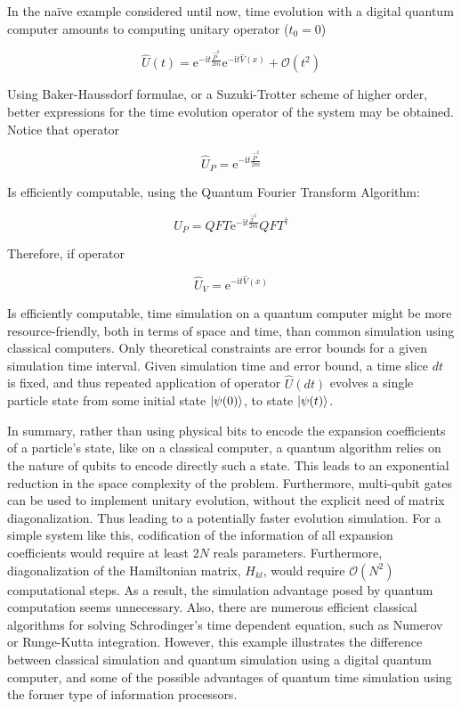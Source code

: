   In the naïve example considered until now, time evolution with a digital quantum computer amounts to computing unitary operator ($t_0 = 0$)

  \begin{equation}
    \hat{U}(t) = \mathrm{e}^{-\mathrm{i}t \frac{\hat{P}^2}{2m}}\mathrm{e}^{-\mathrm{i}t \hat{V}(x)} + \mathcal{O}(t^2)
  \end{equation}

  Using Baker-Haussdorf formulae, or a Suzuki-Trotter scheme of higher order, better expressions for the time evolution operator of the system may be obtained. Notice that operator

  \[
  \hat{U}_P = \mathrm{e}^{-\mathrm{i}t \frac{\hat{P}^2}{2m}}
  \]

  Is efficiently computable, using the Quantum Fourier Transform Algorithm:

  \[
  \hat{U}_P = QFT\mathrm{e}^{-\mathrm{i}t \frac{\hat{x}^2}{2m}}QFT^{\dagger}
  \]

  Therefore, if operator

  \[
  \hat{U}_V = \mathrm{e}^{-\mathrm{i}t \hat{V}(x)}
  \]

  Is efficiently computable, time simulation on a quantum computer might be more resource-friendly, both in terms of space and time, than common simulation using classical computers. Only theoretical constraints are error bounds for a given simulation time interval. Given simulation time and error bound, a time slice $dt$ is fixed, and thus repeated application of operator $\hat{U}(dt)$ evolves a single particle state from some initial state $\ket{\psi(0)}$, to state $\ket{\psi(t)}$.

  

  In summary, rather than using physical bits to encode the expansion coefficients of a particle's state, like on a classical computer, a quantum algorithm relies on the nature of qubits to encode directly such a state. This leads to an exponential reduction in the space complexity of the problem. Furthermore, multi-qubit gates can be used to implement unitary evolution, without the explicit need of matrix diagonalization. Thus leading to a potentially faster evolution simulation. For a simple system like this, codification of the information of all expansion coefficients would require at least $2N$ reals parameters. Furthermore, diagonalization of the Hamiltonian matrix, $H_{kl}$, would require $\mathcal{O}(N^2)$ computational steps. As a result, the simulation advantage posed by quantum computation seems unnecessary. Also, there are numerous efficient classical algorithms for solving Schrodinger's time dependent equation, such as Numerov or Runge-Kutta integration. However, this example illustrates the difference between classical simulation and quantum simulation using a digital quantum computer, and some of the possible advantages of quantum time simulation using the former type of information processors.

